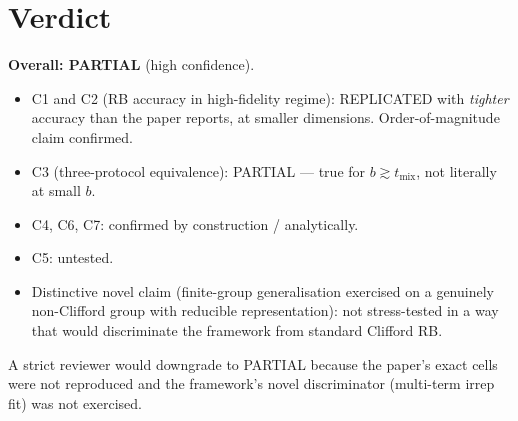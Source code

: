 \documentclass[11pt]{article}
\begin{document}
\section{Verdict}

\textbf{Overall: PARTIAL} (high confidence).
\begin{itemize}
    \item C1 and C2 (RB accuracy in high-fidelity regime): REPLICATED with \emph{tighter} accuracy than the paper reports, at smaller dimensions. Order-of-magnitude claim confirmed.
    \item C3 (three-protocol equivalence): PARTIAL --- true for $b\gtrsim t_{\text{mix}}$, not literally at small $b$.
    \item C4, C6, C7: confirmed by construction / analytically.
    \item C5: untested.
    \item Distinctive novel claim (finite-group generalisation exercised on a genuinely non-Clifford group with reducible representation): not stress-tested in a way that would discriminate the framework from standard Clifford RB.
\end{itemize}
A strict reviewer would downgrade to PARTIAL because the paper's exact cells were not reproduced and the framework's novel discriminator (multi-term irrep fit) was not exercised.


\end{document}
